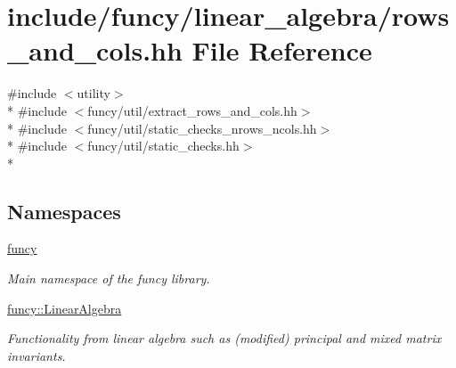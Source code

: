 \hypertarget{rows__and__cols_8hh}{\section{include/funcy/linear\-\_\-algebra/rows\-\_\-and\-\_\-cols.hh File Reference}
\label{rows__and__cols_8hh}
}
{\ttfamily \#include $<$utility$>$}\\*
{\ttfamily \#include $<$funcy/util/extract\-\_\-rows\-\_\-and\-\_\-cols.\-hh$>$}\\*
{\ttfamily \#include $<$funcy/util/static\-\_\-checks\-\_\-nrows\-\_\-ncols.\-hh$>$}\\*
{\ttfamily \#include $<$funcy/util/static\-\_\-checks.\-hh$>$}\\*
\subsection*{Namespaces}
\begin{DoxyCompactItemize}
\item 
\hyperlink{namespacefuncy}{funcy}
\begin{DoxyCompactList}\small\item\em Main namespace of the funcy library. \end{DoxyCompactList}\item 
\hyperlink{namespacefuncy_1_1LinearAlgebra}{funcy\-::\-Linear\-Algebra}
\begin{DoxyCompactList}\small\item\em Functionality from linear algebra such as (modified) principal and mixed matrix invariants. \end{DoxyCompactList}\end{DoxyCompactItemize}

